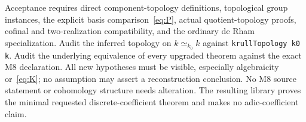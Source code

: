 \documentclass[11pt]{article}
\theoremstyle{remark}\newtheorem{remark}[theorem]{Remark}
\begin{document}
Acceptance requires direct component-topology definitions, topological
group instances, the explicit basis comparison~\eqref{eq:P}, actual
quotient-topology proofs, cofinal and two-realization compatibility,
and the ordinary de Rham specialization. Audit the inferred topology
on $k\simeq_{k_0}k$ against \texttt{krullTopology k0 k}. Audit the
underlying equivalence of every upgraded theorem against the exact
M8 declaration. All new hypotheses must be visible, especially
algebraicity or~\eqref{eq:K}; no assumption may assert a reconstruction
conclusion. No M8 source statement or cohomology structure needs
alteration. The resulting library proves the minimal requested
discrete-coefficient theorem and makes no adic-coefficient claim.
\end{document}
